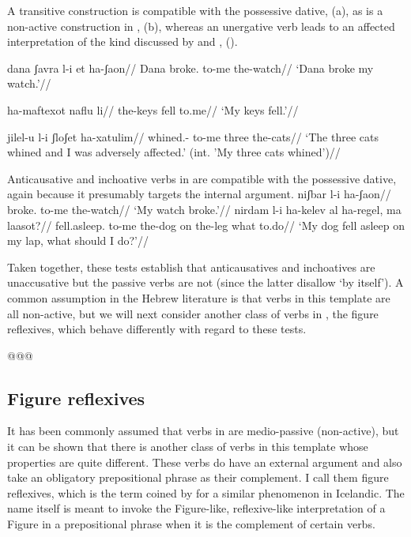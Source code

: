 A transitive construction is compatible with the possessive dative, (\nextx a), as is a non-active construction in {\tnif}, (\nextx b), whereas an unergative verb leads to an affected interpretation of the kind discussed by \cite{arieletal15} and \cite{barashersiegalboneh16}, (\anextx). 

\pex
	\a \begingl
	\gla{}dana ʃavra l-i et ha-ʃaon//
	\glb Dana broke. to-me  the-watch//
	\glft `Dana broke my watch.'//
	\endgl
	
	\a \begingl
		\gla ha-maftexot naflu li//
		\glb the-keys fell to.me//
		\glft `My keys fell.'//
	\endgl
\xe

\ex \begingl
	\gla\ljudge{\#}jilel-u l-i ʃloʃet ha-xatulim//
	\glb whined.- to-me three the-cats//
	\glft `The three cats whined and I was adversely affected.' (int. 'My three cats whined')//
	\endgl
\xe
  
Anticausative and inchoative verbs in {\tnif} are compatible with the possessive dative, again because it presumably targets the internal argument.
\pex
	\a 	\begingl
		\gla{}niʃbar l-i ha-ʃaon//
		\glb broke. to-me the-watch//
		\glft `My watch broke.'//
		\endgl
	\a 	\begingl
		\gla nirdam l-i ha-kelev al ha-regel, ma laasot?//
		\glb fell.asleep. to-me the-dog on the-leg what to.do//
		\glft `My dog fell asleep on my lap, what should I do?'//
		\endgl
\xe

Taken together, these tests establish that anticausatives and inchoatives are unaccusative but the passive verbs are not (since the latter disallow `by itself'). A common assumption in the Hebrew literature is that verbs in this template are all non-active, but we will next consider another class of verbs in {\tnif}, the figure reflexives, which behave differently with regard to these tests.

@@@
	\subsection{Figure reflexives} \label{vz:tnif:figrefl}
It has been commonly assumed that verbs in {\tnif} are medio-passive (non-active), but it can be shown that there is another class of verbs in this template whose properties are quite different. These verbs do have an external argument and also take an obligatory prepositional phrase as their complement. I call them figure reflexives, which is the term coined by \cite{wood14nllt} for a similar phenomenon in Icelandic. The name itself is meant to invoke the Figure-like, reflexive-like interpretation of a Figure in a prepositional phrase when it is the complement of certain verbs. 

